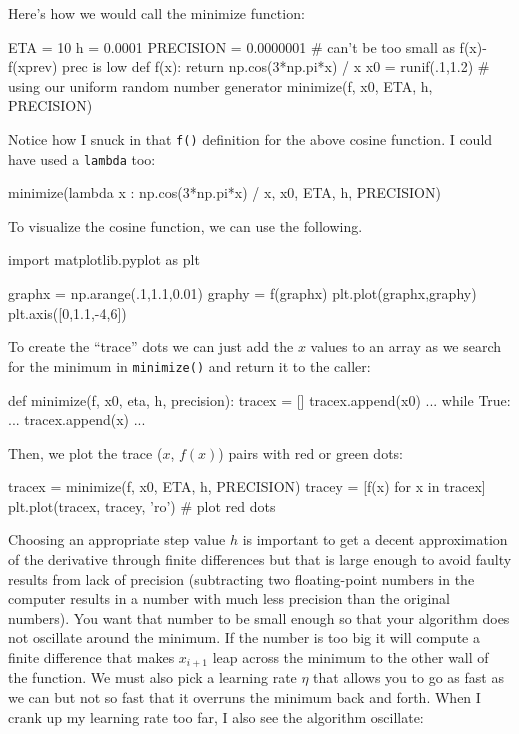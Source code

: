 \documentclass[titlepage]{tufte-book}
\begin{document}
\begin{fullwidth}
\noindent Here's how we would call the minimize function:

\begin{pyverbatim}
ETA = 10
h = 0.0001
PRECISION = 0.0000001 # can't be too small as f(x)-f(xprev) prec is low
def f(x): return np.cos(3*np.pi*x) / x
x0 = runif(.1,1.2)  # using our uniform random number generator
minimize(f, x0, ETA, h, PRECISION)
\end{pyverbatim}

\noindent Notice how I snuck in that {\tt f()} definition for the above cosine function. I could have used a {\tt lambda} too:

\begin{pyverbatim}
minimize(lambda x : np.cos(3*np.pi*x) / x, x0, ETA, h, PRECISION)
\end{pyverbatim}

To visualize the cosine function, we can use the following.

\begin{pyverbatim}
import matplotlib.pyplot as plt

graphx = np.arange(.1,1.1,0.01)
graphy = f(graphx)
plt.plot(graphx,graphy)
plt.axis([0,1.1,-4,6])
\end{pyverbatim}

To create the ``trace'' dots we can just add the $x$ values to an array as we search for the minimum in {\tt minimize()} and return it to the caller:

\begin{pyverbatim}
def minimize(f, x0, eta, h, precision):
    tracex = []
    tracex.append(x0)
    ...
    while True:
        ...
        tracex.append(x)
        ...
\end{pyverbatim}

Then, we plot the trace ($x$, $f(x)$) pairs with red or green dots:

\begin{pyverbatim}
tracex = minimize(f, x0, ETA, h, PRECISION)
tracey = [f(x) for x in tracex]
plt.plot(tracex, tracey, 'ro') # plot red dots
\end{pyverbatim}

Choosing an appropriate step value $h$ is important to get a decent approximation of the derivative through finite differences but that is large enough to avoid faulty results from lack of precision (subtracting two floating-point numbers in the computer results in a number with much less precision than the original numbers). You want that number to be small enough so that your algorithm does not oscillate around the minimum. If the number is too big it will compute a finite difference that makes $x_{i+1}$ leap across the minimum to the other wall of the function.  We must also pick a learning rate $\eta$ that allows you to go as fast as we can but not so fast that it overruns the minimum back and forth. When I crank up my learning rate too far, I also see the algorithm oscillate:


\end{fullwidth}
\end{document}
